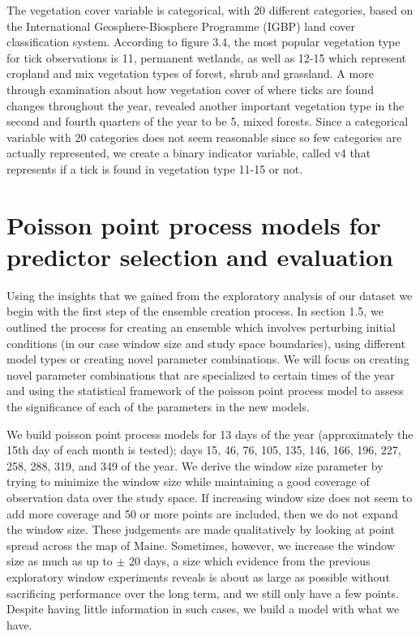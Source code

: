 \noindent The vegetation cover variable is categorical, with 20 different categories, based on the International Geosphere-Biosphere Programme (IGBP) land cover classification system. According to figure 3.4, the most popular vegetation type for tick observations is 11, permanent wetlands, as well as 12-15 which represent cropland and mix vegetation types of forest, shrub and grassland. A more through examination about how vegetation cover of where ticks are found changes throughout the year, revealed another important vegetation type in the second and fourth quarters of the year to be 5, mixed forests. Since a categorical variable with 20 categories does not seem reasonable since so few categories are actually represented, we create a binary indicator variable, called v4 that represents if a tick is found in vegetation type 11-15 or not. 


\section{Poisson point process models for predictor selection and evaluation}

Using the insights that we gained from the exploratory analysis of our dataset we begin with the first step of the ensemble creation process. In section 1.5, we outlined the process for creating an ensemble which involves perturbing initial conditions (in our case window size and study space boundaries), using different model types or creating novel parameter combinations. We will focus on creating novel parameter combinations that are specialized to certain times of the year and using the statistical framework of the poisson point process model to assess the significance of each of the parameters in the new models. \newline

\noindent We build poisson point process models for 13 days of the year (approximately the 15th day of each month is tested); days 15, 46, 76, 105, 135, 146, 166, 196, 227, 258, 288, 319, and 349 of the year. We derive the window size parameter by trying to minimize the window size while maintaining a good coverage of observation data over the study space. If increasing window size does not seem to add more coverage and 50 or more points are included, then we do not expand the window size. These judgements are made qualitatively by looking at point spread across the map of Maine. Sometimes, however, we increase the window size as much as up to $\pm$ 20 days, a size which evidence from the previous exploratory window experiments reveals is about as large as possible without sacrificing performance over the long term, and we still only have a few points. Despite having little information in such cases, we build a model with what we have.  \newline

